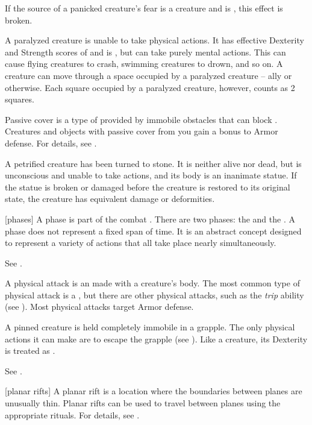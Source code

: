 If the source of a panicked creature's fear is a creature and is , this effect is broken.

 A paralyzed creature is unable to take physical actions. It has effective Dexterity and Strength scores of  and is \helpless, but can take purely mental actions. This can cause flying creatures to crash, swimming creatures to drown, and so on. A creature can move through a space occupied by a paralyzed creature -- ally or otherwise. Each square occupied by a paralyzed creature, however, counts as 2 squares.

 Passive cover is a type of  provided by immobile obstacles that can block .
Creatures and objects with passive cover from you gain a  bonus to Armor defense.
For details, see .

 A petrified creature has been turned to stone. It is neither alive nor dead, but is unconscious and unable to take actions, and its body is an inanimate statue. If the statue is broken or damaged before the creature is restored to its original state, the creature has equivalent damage or deformities.

[phases] A phase is part of the combat .
There are two phases: the  and the .
A phase does not represent a fixed span of time.
It is an abstract concept designed to represent a variety of actions that all take place nearly simultaneously.

 See .

 A physical attack is an  made with a creature's body.
The most common type of physical attack is a , but there are other physical attacks, such as the \textit{trip} ability (see ).
Most physical attacks target Armor defense.

 A pinned creature is held completely immobile in a grapple.
The only physical actions it can make are to escape the grapple (see ).
Like a  creature, its Dexterity is treated as .

 See .

[planar rifts] A planar rift is a location where the boundaries between planes are unusually thin.
Planar rifts can be used to travel between planes using the appropriate rituals.
For details, see \label{Planar Rifts}.

